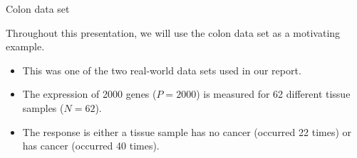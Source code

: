 \documentclass[8pt]{beamer}
\newcommand{\mys}{\vspace{0.5cm} \pause
}
\begin{document}
\begin{frame}{Colon data set}


Throughout this presentation, we will use the colon data set as a motivating example.
\begin{itemize}
    \item This was one of the two real-world data sets used in our report.
    \item The expression of 2000 genes ($P=2000$) is measured for 62 different tissue samples ($N = 62$).
    \item The response is either a tissue sample has no cancer (occurred 22 times) or has cancer (occurred 40 times).
\end{itemize}
    
\end{frame}
\end{document}
